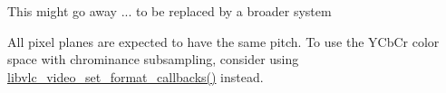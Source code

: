 
\begin{DoxyRefList}
\item[\label{bug__bug000002}%
\Hypertarget{bug__bug000002}%
Member \hyperlink{group__libvlc__media__player_ga057b0d82fb84f60ee24a6d76c1f135f3}{libvlc\+\_\+media\+\_\+player\+\_\+get\+\_\+length} (libvlc\+\_\+media\+\_\+player\+\_\+t $\ast$p\+\_\+mi)]This might go away ... to be replaced by a broader system  
\item[\label{bug__bug000001}%
\Hypertarget{bug__bug000001}%
Member \hyperlink{group__libvlc__media__player_ga6518394e05d458731c11c86edb23f4cc}{libvlc\+\_\+video\+\_\+set\+\_\+format} (libvlc\+\_\+media\+\_\+player\+\_\+t $\ast$mp, const char $\ast$chroma, unsigned width, unsigned height, unsigned pitch)]All pixel planes are expected to have the same pitch. To use the Y\+Cb\+Cr color space with chrominance subsampling, consider using \hyperlink{group__libvlc__media__player_gafbeef69fb76b4c4d6cb25145aee1ad99}{libvlc\+\_\+video\+\_\+set\+\_\+format\+\_\+callbacks()} instead. 
\end{DoxyRefList}